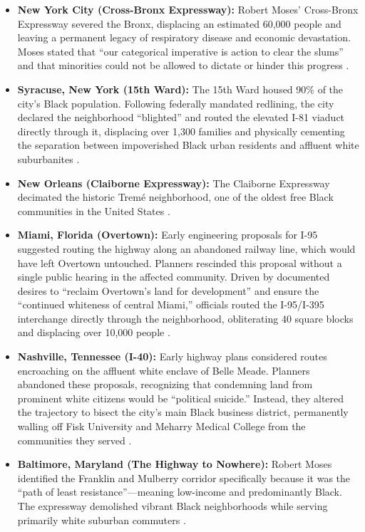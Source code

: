 \documentclass[12pt,openany]{book}
\providecommand{\tightlist}{\setlength{\itemsep}{0pt}\setlength{\parskip}{0pt}}
\begin{document}
\begin{itemize}
\tightlist
\item \textbf{New York City (Cross-Bronx Expressway):} Robert Moses' Cross-Bronx Expressway severed the Bronx, displacing an estimated 60,000 people and leaving a permanent legacy of respiratory disease and economic devastation. Moses stated that ``our categorical imperative is action to clear the slums'' and that minorities could not be allowed to dictate or hinder this progress \cite{tel_crossbronx}.
\item \textbf{Syracuse, New York (15th Ward):} The 15th Ward housed 90\% of the city's Black population. Following federally mandated redlining, the city declared the neighborhood ``blighted'' and routed the elevated I-81 viaduct directly through it, displacing over 1,300 families and physically cementing the separation between impoverished Black urban residents and affluent white suburbanites \cite{tel_aclu_i81}.
\item \textbf{New Orleans (Claiborne Expressway):} The Claiborne Expressway decimated the historic Trem\'{e} neighborhood, one of the oldest free Black communities in the United States \cite{tel_claiborne}.
\item \textbf{Miami, Florida (Overtown):} Early engineering proposals for I-95 suggested routing the highway along an abandoned railway line, which would have left Overtown untouched. Planners rescinded this proposal without a single public hearing in the affected community. Driven by documented desires to ``reclaim Overtown's land for development'' and ensure the ``continued whiteness of central Miami,'' officials routed the I-95/I-395 interchange directly through the neighborhood, obliterating 40 square blocks and displacing over 10,000 people \cite{tel_overtown}.
\item \textbf{Nashville, Tennessee (I-40):} Early highway plans considered routes encroaching on the affluent white enclave of Belle Meade. Planners abandoned these proposals, recognizing that condemning land from prominent white citizens would be ``political suicide.'' Instead, they altered the trajectory to bisect the city's main Black business district, permanently walling off Fisk University and Meharry Medical College from the communities they served \cite{tel_nashville}.
\item \textbf{Baltimore, Maryland (The Highway to Nowhere):} Robert Moses identified the Franklin and Mulberry corridor specifically because it was the ``path of least resistance''---meaning low-income and predominantly Black. The expressway demolished vibrant Black neighborhoods while serving primarily white suburban commuters \cite{tel_baltimore}.
\end{itemize}
\end{document}
